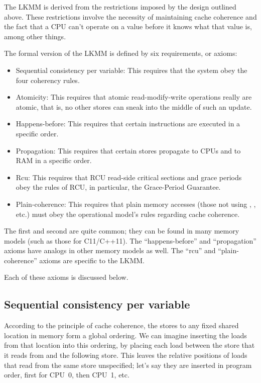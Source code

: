The LKMM is derived from the restrictions imposed by the design
outlined above.
These restrictions involve the necessity of maintaining cache
coherence and the fact that a CPU can't operate on a value before
it knows what that value is, among other things.

The formal version of the LKMM is defined by six requirements, or
axioms:

\begin{itemize}
\item	Sequential consistency per variable:
	This requires that the system obey the four coherency rules.

\item	Atomicity:
	This requires that atomic read-modify-write operations really
	are atomic, that is, no other stores can sneak into the
	middle of such an update.

\item	Happens-before:
	This requires that certain instructions are executed in a
	specific order.

\item	Propagation:
	This requires that certain stores propagate to CPUs and to
	RAM in a specific order.

\item	Rcu:
	This requires that RCU read-side critical sections and
	grace periods obey the rules of RCU, in particular, the
	Grace-Period Guarantee.

\item	Plain-coherence:
	This requires that plain memory accesses (those not using
	, , etc.\@) must obey
	the operational model's rules regarding cache coherence.
\end{itemize}

The first and second are quite common; they can be found in many
memory models (such as those for C11/C++11).
The ``happens-before'' and ``propagation'' axioms have analogs
in other memory models as well.
The ``rcu'' and ``plain-coherence'' axioms are specific to the LKMM\@.

Each of these axioms is discussed below.


\subsection{Sequential consistency per variable}
\label{sec:docs:explanation:Sequential Consistency per Variable}

According to the principle of cache coherence, the stores to any fixed
shared location in memory form a global ordering.
We can imagine inserting the loads from that location into this
ordering, by placing each load between the store that it reads from
and the following store.
This leaves the relative positions of loads that read from the same
store unspecified; let's say they are inserted in program order,
first for CPU~0, then CPU~1, etc.

